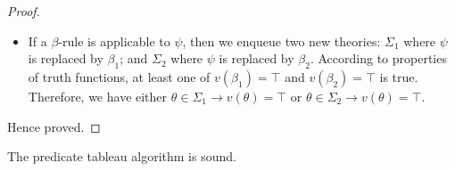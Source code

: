 \begin{proof}
\begin{itemize}
\begin{itemize}
            \item If a \(\beta\)-rule is applicable to \(\psi\), then we enqueue two new theories: \(\Sigma_1\) where \(\psi\) is replaced by \(\beta_1\); and \(\Sigma_2\) where \(\psi\) is replaced by \(\beta_2\). According to properties of truth functions, at least one of \(v(\beta_1) = \top\) and \(v(\beta_2) = \top\) is true. Therefore, we have either \(\theta \in \Sigma_1 \rightarrow v(\theta) = \top\) or \(\theta \in \Sigma_2 \rightarrow v(\theta) = \top\).
        \end{itemize}
    \end{itemize}
    Hence proved.
\end{proof}



\begin{theorem}
    The predicate tableau algorithm is sound. 
\end{theorem}
